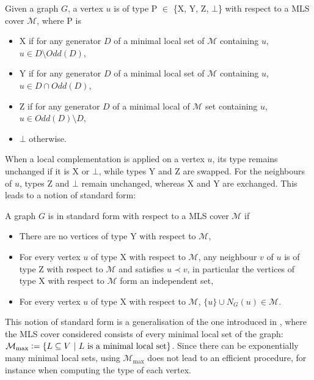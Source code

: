 \documentclass[a4paper,UKenglish,cleveref,autoref,thm-restate]{arxiv}
\newcommand{\defeq}{\vcentcolon=}
\newcommand{\se}{\subseteq}
\newcommand{\sm}{\setminus}
\begin{document}
\begin{definition} \label{def:type}Given a graph $G$, a vertex $u$ is of type P $\in$ \{X, Y, Z, $\bot$\} with respect to a MLS cover $\mathcal M$, where P is
    \begin{itemize}
        \item  X if for any generator $D$ of a minimal local set of $\mathcal M$ containing $u$, $u\in D \sm Odd(D)$,
        \item  Y if for any generator $D$ of a minimal local set of $\mathcal M$ containing $u$, $u\in D \cap Odd(D)$, 
        \item Z if for any generator $D$ of a minimal local of $\mathcal M$ set containing $u$, $u\in Odd(D) \sm D$, 
        \item $\bot$ otherwise. 
    \end{itemize}
    \end{definition}
        
When a local complementation is applied on a vertex $u$, its type remains unchanged if it is X or $\bot$, while types Y and Z are swapped. For the neighbours of $u$, types Z and  $\bot$ remain unchanged, whereas  X and  Y are exchanged. This leads to a notion of standard form: 
    

\begin{definition}
    A graph $G$ is in standard form with respect to a MLS cover $\mathcal M$ if
    \begin{itemize}
        \item There are no vertices of type Y with respect to $\mathcal M$,
        \item For every vertex $u$ of type X with respect to $\mathcal M$, any neighbour $v$ of $u$ is of type Z with respect to $\mathcal M$ and satisfies $u\prec v$, in particular the vertices of type X with respect to $\mathcal M$ form an independent set,
        \item For every vertex $u$ of type X with respect to $\mathcal M$, $\{u\} \cup N_G(u) \in \mathcal M$.
    \end{itemize}
\end{definition}

\begin{remark}This notion of standard form is a generalisation of the one introduced in \cite{claudet2024local}, where the MLS cover considered consists of every minimal local set of the graph: $\mathcal M_\text{max} \defeq \{L \se V ~|~ L \text{~is a minimal local set}\}$. Since there can be exponentially many minimal local sets, using $\mathcal M_\text{max}$ does not lead to an efficient procedure, for instance when computing the type of each vertex.
\end{remark}
\end{document}
